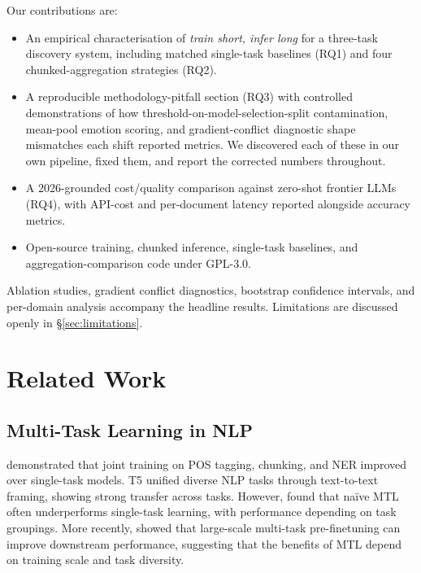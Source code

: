 \documentclass[11pt]{article}
\begin{document}
Our contributions are:

\begin{itemize}
    \item An empirical characterisation of \textit{train short, infer long} for a three-task discovery system, including matched single-task baselines (RQ1) and four chunked-aggregation strategies (RQ2).
    \item A reproducible methodology-pitfall section (RQ3) with controlled demonstrations of how threshold-on-model-selection-split contamination, mean-pool emotion scoring, and gradient-conflict diagnostic shape mismatches each shift reported metrics. We discovered each of these in our own pipeline, fixed them, and report the corrected numbers throughout.
    \item A 2026-grounded cost/quality comparison against zero-shot frontier LLMs (RQ4), with API-cost and per-document latency reported alongside accuracy metrics.
    \item Open-source training, chunked inference, single-task baselines, and aggregation-comparison code under GPL-3.0.
\end{itemize}

Ablation studies, gradient conflict diagnostics, bootstrap confidence intervals, and per-domain analysis accompany the headline results. Limitations are discussed openly in \S\ref{sec:limitations}.

\section{Related Work}

\subsection{Multi-Task Learning in NLP}

\citet{collobert2011natural} demonstrated that joint training on POS tagging, chunking, and NER improved over single-task models. T5 \citep{raffel2020exploring} unified diverse NLP tasks through text-to-text framing, showing strong transfer across tasks. However, \citet{standley2020tasks} found that na\"ive MTL often underperforms single-task learning, with performance depending on task groupings. More recently, \citet{aghajanyan2021muppet} showed that large-scale multi-task pre-finetuning can improve downstream performance, suggesting that the benefits of MTL depend on training scale and task diversity.
\end{document}
